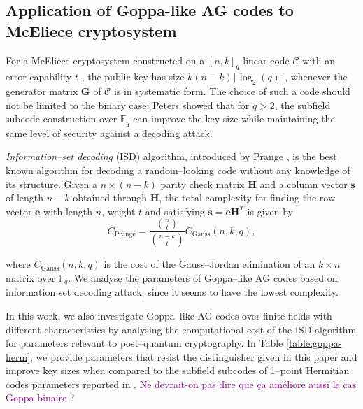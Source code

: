 \documentclass[a4paper]{amsart}
\theoremstyle{definition}
\theoremstyle{remark}
\newcommand{\calC}{\mathcal{C}}
\newcommand{\fq}{\mathbb{F}_{q}}
\newcommand\jade[1]{\textcolor{purple}{#1}}
\begin{document}
\subsection*{Application of Goppa-like AG codes to McEliece cryptosystem}


For a McEliece cryptosystem constructed on a $[n,k]_q$ linear code $\calC$ with an error capability $t$ , the public key has size $k(n-k)\lceil \log_2(q) \rceil$, whenever the generator matrix $\mathbf{G}$ of $\calC$ is in systematic form. The choice of such a code should not be limited to the binary case: Peters \cite{petersIsd} showed that for $q > 2$, the subfield subcode construction over $\fq$ can improve the key size while maintaining the same level of security against a decoding attack. 

\emph{Information--set decoding} (ISD) algorithm, introduced by Prange \cite{prange}, is the best known algorithm for decoding a random--looking code without any knowledge of its structure. Given a $n\times (n-k)$ parity check matrix $\mathbf{H}$ and a column vector $\mathbf{s}$ of length $n-k$ obtained through $\mathbf{H}$, the total complexity for finding the row vector $\mathbf{e}$ with length $n$, weight $t$ and satisfying $\mathbf{s}=\mathbf{eH}^{T}$ is given by 
$$ C_\text{Prange}= \frac{\binom{n}{t}}{\binom{n-k}{t}}C_\text{Gauss}(n,k,q),$$

where $C_\text{Gauss}(n,k,q)$ is the cost of the Gauss--Jordan elimination of an $k\times n$ matrix over $\mathbb{F}_q$. We analyse the parameters of Goppa--like AG codes based on information set decoding attack, since it seems to have the lowest complexity.
 
In this work, we also investigate Goppa--like AG codes over finite fields with different characteristics by analysing the computational cost of the ISD algorithm for parameters relevant to post--quantum cryptography. In Table \ref{table:goppa-herm}, we provide parameters that resist the distinguisher given in this paper and improve key sizes when compared to the subfield subcodes of 1--point Hermitian codes parameters reported in \cite[Table~3]{EKN21crypto}.
\jade{Ne devrait-on pas dire que ça améliore aussi le cas Goppa binaire ?}
\end{document}
